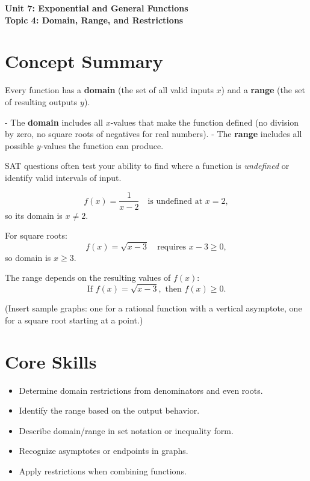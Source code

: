 \documentclass[12pt]{article}
\begin{document}
\begin{center}
    \LARGE \textbf{Unit 7: Exponential and General Functions} \\[6pt]
    \Large \textbf{Topic 4: Domain, Range, and Restrictions}
\end{center}

\vspace{1em}

\section*{Concept Summary}

Every function has a \textbf{domain} (the set of all valid inputs \(x\)) and a \textbf{range} (the set of resulting outputs \(y\)).

- The \textbf{domain} includes all \(x\)-values that make the function defined (no division by zero, no square roots of negatives for real numbers).
- The \textbf{range} includes all possible \(y\)-values the function can produce.

SAT questions often test your ability to find where a function is \emph{undefined} or identify valid intervals of input.

\[
f(x) = \frac{1}{x - 2} \quad \text{is undefined at } x = 2,
\]
so its domain is \(x \neq 2.\)

For square roots:
\[
f(x) = \sqrt{x - 3} \quad \text{requires } x - 3 \ge 0,
\]
so domain is \(x \ge 3.\)

The range depends on the resulting values of \(f(x)\):
\[
\text{If } f(x) = \sqrt{x - 3}, \text{ then } f(x) \ge 0.
\]

(Insert sample graphs: one for a rational function with a vertical asymptote, one for a square root starting at a point.)

\section*{Core Skills}
\begin{itemize}
  \item Determine domain restrictions from denominators and even roots.
  \item Identify the range based on the output behavior.
  \item Describe domain/range in set notation or inequality form.
  \item Recognize asymptotes or endpoints in graphs.
  \item Apply restrictions when combining functions.
\end{itemize}
\end{document}
